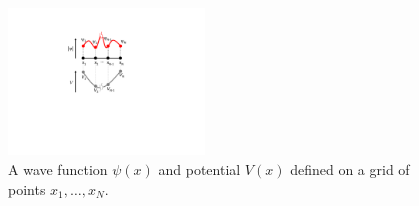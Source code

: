 \begin{figure}
\vspace{-1cm}
\includegraphics[width=5.2cm]{"./material/papers/grover/grover_derivation_schroedinger"}
\caption{A wave function $\psi(x)$ and potential $V(x)$ defined on a grid of points $x_1,\hdots,x_N$.}
\label{fig:GroverDerivationSchroedinger}
\end{figure}


